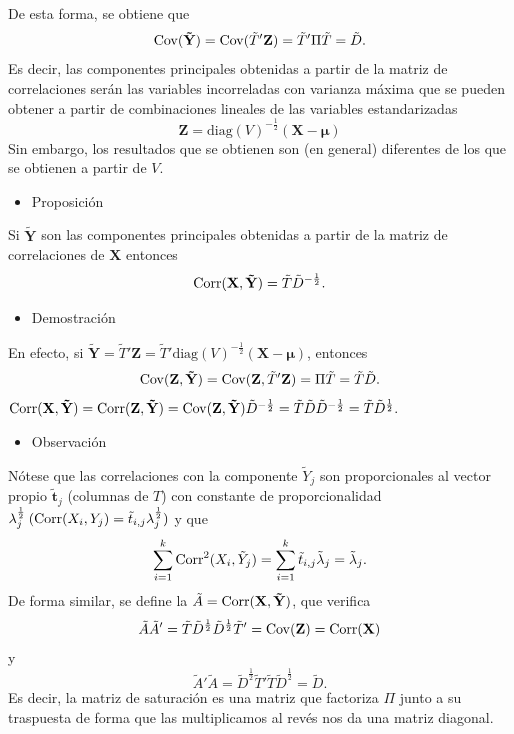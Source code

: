 De esta forma, se obtiene que \[ \operatorname{Cov}(\mathbf{\tilde{Y}})=\operatorname{Cov}(\tilde{T}'\mathbf{Z})=\tilde{T}'\Pi\tilde{T}=\tilde{D}. \]
Es decir, las componentes principales obtenidas a partir de la matriz de correlaciones serán las variables incorreladas con varianza máxima que se pueden obtener a partir de combinaciones lineales de las variables estandarizadas \[ \mathbf{Z}=\mathrm{diag}(V)^{-\frac{1}{2}}(\mathbf{X-\mu}) \]
Sin embargo, los resultados que se obtienen son (en general) diferentes de los que se obtienen a partir de $V$.
\begin{itemize}[label=\color{red}\textbullet, leftmargin=*]
	\item \color{lightblue}Proposición
\end{itemize}
Si $\mathbf{\tilde{Y}}$ son las componentes principales obtenidas a partir de la matriz de correlaciones de $\mathbf{X}$ entonces \[ \operatorname{Corr}(\mathbf{X,\tilde{Y}})=\tilde{T}\tilde{D}^{-\frac{1}{2}}. \]
\begin{itemize}[label=\color{red}\textbullet, leftmargin=*]
	\item \color{lightblue}Demostración
\end{itemize}
En efecto, si $\mathbf{\tilde{Y}}=\tilde{T}'\mathbf{Z}=\tilde{T}'\mathrm{diag}(V)^{-\frac{1}{2}}(\mathbf{X-\mu})$, entonces \[ \operatorname{Cov}(\mathbf{Z,\tilde{Y}})=\operatorname{Cov}(\mathbf{Z},\tilde{T}'\mathbf{Z})=\Pi\tilde{T}=\tilde{T}\tilde{D}. \]$\operatorname{Corr}(\mathbf{X,\tilde{Y}})=\operatorname{Corr}(\mathbf{Z,\tilde{Y}})=\operatorname{Cov}(\mathbf{Z,\tilde{Y}})\tilde{D}^{-\frac{1}{2}}=\tilde{T}\tilde{D}\tilde{D}^{-\frac{1}{2}}=\tilde{T}\tilde{D}^{\frac{1}{2}}.$
\begin{itemize}[label=\color{red}\textbullet, leftmargin=*]
	\item \color{lightblue}Observación
\end{itemize}
Nótese que las correlaciones con la componente $\tilde{Y}_j$ son proporcionales al vector propio $\mathbf{\tilde{t}}_j$ (columnas de $T$) con constante de proporcionalidad $\lambda_j^{\frac{1}{2}}\:(\operatorname{Corr}(X_i,Y_j)=\tilde{t}_{i,j}\lambda_j^{\frac{1}{2}})$ y que \[ \sum_{i=1}^{k}\operatorname{Corr}^2(X_i,\tilde{Y}_j)=\sum_{i=1}^{k}\tilde{t}_{i,j}\tilde{\lambda}_j=\tilde{\lambda}_j. \]
De forma similar, se define la  $\tilde{A}=\operatorname{Corr}(\mathbf{X,\tilde{Y}})$, que verifica \[ \tilde{A}\tilde{A}'=\tilde{T}\tilde{D}^{\frac{1}{2}}\tilde{D}^{\frac{1}{2}}\tilde{T}'=\operatorname{Cov}(\mathbf{Z})=\operatorname{Corr}(\mathbf{X}) \]y \[ \tilde{A}'\tilde{A}=\tilde{D}^{\frac{1}{2}}\tilde{T}'\tilde{T}\tilde{D}^{\frac{1}{2}}=\tilde{D}. \]
Es decir, la matriz de saturación es una matriz que factoriza $\Pi$ junto a su traspuesta de forma que las multiplicamos al revés nos da una matriz diagonal.

